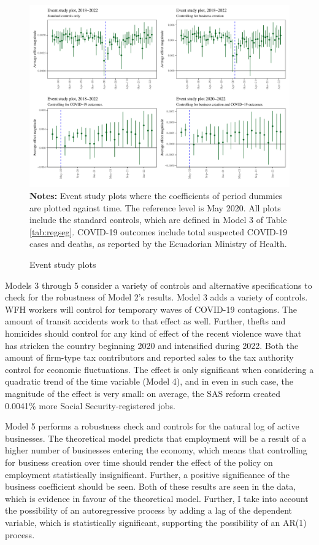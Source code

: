 \documentclass[11pt,a4paper]{article}\usepackage[]{graphicx}\usepackage[]{xcolor}
\makeatletter
\def\maxwidth{ %
  \ifdim\Gin@nat@width>\linewidth
    \linewidth
  \else
    \Gin@nat@width
  \fi
}
\newenvironment{knitrout}{}{} %
\makeatother
\begin{document}
\begin{figure}[htbp!]
\caption{Event study plots}
\label{fig:event}
\begin{knitrout}
\color{fgcolor}
\includegraphics[width=\maxwidth]{figure/event-study-1} 
\end{knitrout}
\textbf{Notes:} Event study plots where the coefficients of period dummies are plotted against time. The reference level is May 2020. All plots include the standard controls, which are defined in Model 3 of Table \ref{tab:regseg}. COVID-19 outcomes include total suspected COVID-19 cases and deaths, as reported by the Ecuadorian Ministry of Health.
\end{figure}

Models 3 through 5 consider a variety of controls and alternative specifications to check for the robustness of Model 2's results. Model 3 adds a variety of controls. WFH workers will control for temporary waves of COVID-19 contagions. The amount of transit accidents work to that effect as well. Further, thefts and homicides should control for any kind of effect of the recent violence wave that has stricken the country beginning 2020 and intensified during 2022. Both the amount of firm-type tax contributors and reported sales to the tax authority control for economic fluctuations. The effect is only significant when considering a quadratic trend of the time variable (Model 4), and in even in such case, the magnitude of the effect is very small: on average, the SAS reform created 0.0041\% more Social Security-registered jobs. 

Model 5 performs a robustness check and controls for the natural log of active businesses. The theoretical model predicts that employment will be a result of a higher number of businesses entering the economy, which means that controlling for business creation over time should render the effect of the policy on employment statistically insignificant. Further, a positive significance of the business coefficient should be seen. Both of these results are seen in the data, which is evidence in favour of the theoretical model. Further, I take into account the possibility of an autoregressive process by adding a lag of the dependent variable, which is statistically significant, supporting the possibility of an AR(1) process. 
\end{document}
